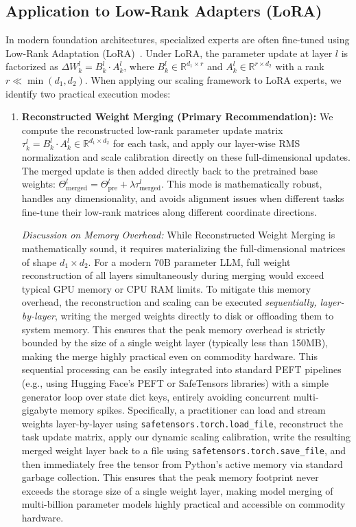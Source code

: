\subsection{Application to Low-Rank Adapters (LoRA)}
In modern foundation architectures, specialized experts are often fine-tuned using Low-Rank Adaptation (LoRA)~\cite{hu21lora}. Under LoRA, the parameter update at layer $l$ is factorized as $\Delta W_k^l = B_k^l \cdot A_k^l$, where $B_k^l \in \mathbb{R}^{d_1 \times r}$ and $A_k^l \in \mathbb{R}^{r \times d_2}$ with a rank $r \ll \min(d_1, d_2)$. When applying our scaling framework to LoRA experts, we identify two practical execution modes:
\begin{enumerate}
    \item \textbf{Reconstructed Weight Merging (Primary Recommendation):} We compute the reconstructed low-rank parameter update matrix $\tau_k^l = B_k^l \cdot A_k^l \in \mathbb{R}^{d_1 \times d_2}$ for each task, and apply our layer-wise RMS normalization and scale calibration directly on these full-dimensional updates. The merged update is then added directly back to the pretrained base weights: $\Theta_{\text{merged}}^l = \Theta_{\text{pre}}^l + \lambda \tau_{\text{merged}}^l$. This mode is mathematically robust, handles any dimensionality, and avoids alignment issues when different tasks fine-tune their low-rank matrices along different coordinate directions.
    
    \textit{Discussion on Memory Overhead:} While Reconstructed Weight Merging is mathematically sound, it requires materializing the full-dimensional matrices of shape $d_1 \times d_2$. For a modern 70B parameter LLM, full weight reconstruction of all layers simultaneously during merging would exceed typical GPU memory or CPU RAM limits. To mitigate this memory overhead, the reconstruction and scaling can be executed \textit{sequentially, layer-by-layer}, writing the merged weights directly to disk or offloading them to system memory. This ensures that the peak memory overhead is strictly bounded by the size of a single weight layer (typically less than 150MB), making the merge highly practical even on commodity hardware. This sequential processing can be easily integrated into standard PEFT pipelines (e.g., using Hugging Face's PEFT or SafeTensors libraries) with a simple generator loop over state dict keys, entirely avoiding concurrent multi-gigabyte memory spikes. Specifically, a practitioner can load and stream weights layer-by-layer using \texttt{safetensors.torch.load\_file}, reconstruct the task update matrix, apply our dynamic scaling calibration, write the resulting merged weight layer back to a file using \texttt{safetensors.torch.save\_file}, and then immediately free the tensor from Python's active memory via standard garbage collection. This ensures that the peak memory footprint never exceeds the storage size of a single weight layer, making model merging of multi-billion parameter models highly practical and accessible on commodity hardware.
    

\end{enumerate}
